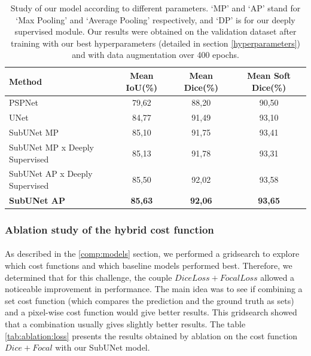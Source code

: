 \documentclass[english]{article}
\begin{document}
\begin{table}[H]
    \footnotesize
    \centering
    \begin{tabular}{ l c c c }
        \hline
        Method & Mean IoU(\%) & Mean Dice(\%) & Mean Soft Dice(\%) \\
        \hline\hline
        PSPNet & 79,62 & 88,20 & 90,50 \\
        UNet & 84,77 & 91,49 & 93,10 \\
        SubUNet MP & 85,10 & 91,75 & 93,41 \\
        SubUNet MP x Deeply Supervised & 85,13 & 91,78 & 93,31 \\
        SubUNet AP x Deeply Supervised & 85,50 & 92,02 & 93,58 \\
        \textbf{SubUNet AP} & \textbf{85,63} & \textbf{92,06} & \textbf{93,65} \\
        \hline
    \end{tabular}
    \caption{Study of our model according to different parameters. `MP' and `AP' stand for `Max Pooling' and `Average Pooling' respectively, and `DP' is for our deeply supervised module. Our results were obtained on the validation dataset after training with our best hyperparameters (detailed in section \ref{hyperparameters}) and with data augmentation over 400 epochs.}
    \label{tab:ablation:model}
\end{table}

\subsubsection{Ablation study of the hybrid cost function}
\label{loss_ablation}
\paragraph{}
As described in the \ref{comp:models} section, we performed a gridsearch to explore which cost functions and which baseline models performed best. Therefore, we determined that for this challenge, the couple \(Dice Loss + Focal Loss\) allowed a noticeable improvement in performance. The main idea was to see if combining a set cost function (which compares the prediction and the ground truth as sets) and a pixel-wise cost function would give better results. This gridsearch showed that a combination usually gives slightly better results. The table \ref{tab:ablation:loss} presents the results obtained by ablation on the cost function \(Dice + Focal\) with our SubUNet model.
\end{document}

